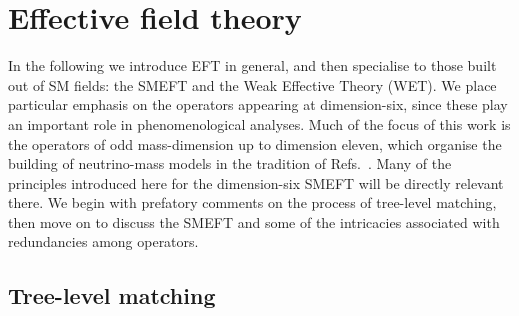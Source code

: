 \section{Effective field theory}

In the following we introduce EFT in general, and then specialise to those built
out of SM fields: the SMEFT and the Weak Effective Theory (WET). We place
particular emphasis on the operators appearing at dimension-six, since these
play an important role in phenomenological analyses. Much of the focus of this
work is the operators of odd mass-dimension up to dimension eleven, which
organise the building of neutrino-mass models in the tradition of
Refs.~\cite{Babu:2001ex, deGouvea:2007qla, PhysRevD.87.073007, Cai:2014kra}.
Many of the principles introduced here for the dimension-six SMEFT will be
directly relevant there. We begin with prefatory comments on the process of
tree-level matching, then move on to discuss the SMEFT and some of the
intricacies associated with redundancies among operators.

\subsection{Tree-level matching}
\label{sec:ch1-tree-level-matching}


